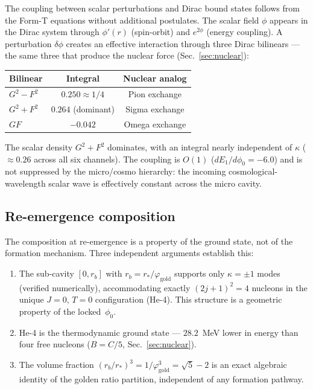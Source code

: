 \documentclass[aps,prd,twocolumn,superscriptaddress,nofootinbib,longbibliography]{revtex4-2}
\newcommand{\rstar}{r_{*}}
\newcommand{\phiz}{\phi_0}
\newcommand{\vgold}{\varphi_{\mathrm{gold}}}
\begin{document}
The coupling between scalar perturbations and Dirac bound states
follows from the Form-T equations without additional postulates.  The
scalar field $\phi$ appears in the Dirac system through $\phi'(r)$
(spin-orbit) and $e^{2\phi}$ (energy coupling).  A perturbation
$\delta\phi$ creates an effective interaction through three Dirac
bilinears --- the same three that produce the nuclear force
(Sec.~\ref{sec:nuclear}):
\begin{center}
\begin{tabular}{lcc}
\hline
Bilinear & Integral & Nuclear analog \\
\hline
$G^2 - F^2$ & $0.250 \approx 1/4$ & Pion exchange \\
$G^2 + F^2$ & $0.264$ (dominant) & Sigma exchange \\
$GF$ & $-0.042$ & Omega exchange \\
\hline
\end{tabular}
\end{center}
The scalar density $G^2\!+\!F^2$ dominates, with an integral nearly
independent of $\kappa$ ($\approx 0.26$ across all six channels).  The
coupling is $O(1)$ ($dE_1/d\phiz = -6.0$) and is not suppressed by
the micro/cosmo hierarchy: the incoming cosmological-wavelength scalar
wave is effectively constant across the micro cavity.

\subsection{Re-emergence composition}

The composition at re-emergence is a property of the ground state, not
of the formation mechanism.  Three independent arguments establish
this:

\begin{enumerate}
\item The sub-cavity $[0, r_b]$ with $r_b = \rstar/\vgold$ supports
  only $\kappa = \pm 1$ modes (verified numerically), accommodating
  exactly $(2j+1)^2 = 4$ nucleons in the unique $J=0$, $T=0$
  configuration (He-4).  This structure is a geometric property of
  the locked~$\phiz$.

\item He-4 is the thermodynamic ground state --- $28.2$~MeV lower in
  energy than four free nucleons ($B = C/5$,
  Sec.~\ref{sec:nuclear}).

\item The volume fraction $(r_b/\rstar)^3 = 1/\vgold^3 = \sqrt{5}-2$
  is an exact algebraic identity of the golden ratio partition,
  independent of any formation pathway.
\end{enumerate}
\end{document}
